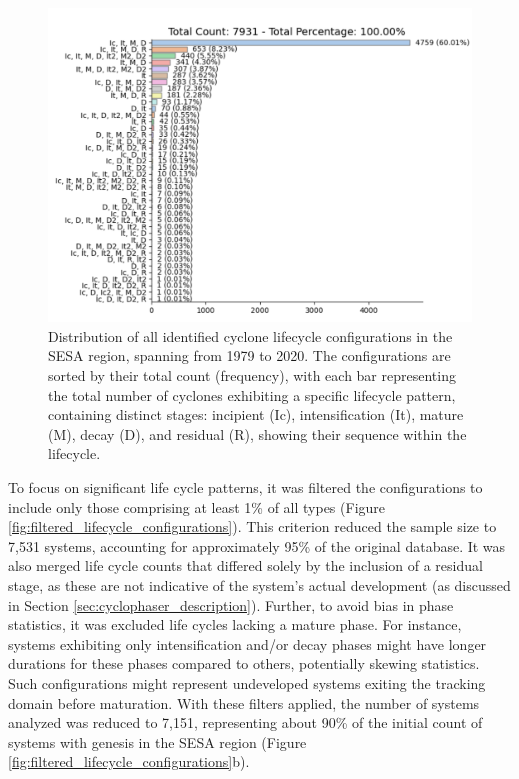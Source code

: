 \begin{figure}[ht]
    \centering
    \includegraphics[width=\textwidth]{figs_4/combined_barplots_total_all_systems.pdf}
    \caption[Life cycle configurations]{Distribution of all identified cyclone lifecycle configurations in the SESA region, spanning from 1979 to 2020. The configurations are sorted by their total count (frequency), with each bar representing the total number of cyclones exhibiting a specific lifecycle pattern, containing distinct stages: incipient (Ic), intensification (It), mature (M), decay (D), and residual (R), showing their sequence within the lifecycle.}
\label{fig:all_lifecycle_configurations}
\end{figure}

To focus on significant life cycle patterns, it was filtered the configurations to include only those comprising at least 1\% of all types (Figure \ref{fig:filtered_lifecycle_configurations}). This criterion reduced the sample size to 7,531 systems, accounting for approximately 95\% of the original database. It was also merged life cycle counts that differed solely by the inclusion of a residual stage, as these are not indicative of the system's actual development (as discussed in Section \ref{sec:cyclophaser_description}). Further, to avoid bias in phase statistics, it was excluded life cycles lacking a mature phase. For instance, systems exhibiting only intensification and/or decay phases might have longer durations for these phases compared to others, potentially skewing statistics. Such configurations might represent undeveloped systems exiting the tracking domain before maturation. With these filters applied, the number of systems analyzed was reduced to 7,151, representing about 90\% of the initial count of systems with genesis in the SESA region (Figure \ref{fig:filtered_lifecycle_configurations}b).

